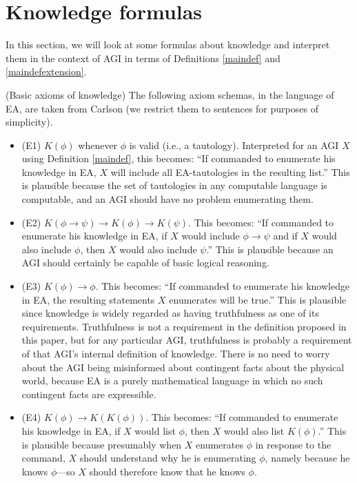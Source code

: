 \documentclass[runningheads]{llncs}
\begin{document}
\section{Knowledge formulas}
\label{appsection}

In this section, we will look at some formulas about knowledge and interpret them in the
context of AGI in terms of Definitions \ref{maindef} and \ref{maindefextension}.

\begin{example}
  (Basic axioms of knowledge) The following axiom schemas, in the language
  of EA, are taken from Carlson \cite{carlson}
  (we restrict them to sentences for purposes of simplicity).
  \begin{itemize}
    \item (E1) $K(\phi)$ whenever $\phi$ is valid (i.e., a tautology).
    Interpreted for an AGI $X$ using Definition \ref{maindef}, this becomes:
    ``If commanded to enumerate his knowledge in EA, $X$ will include
    all EA-tautologies in the resulting list.'' This is plausible
    because the set of tautologies in any computable language is computable,
    and an AGI should have no problem enumerating them.
    \item (E2) $K(\phi\rightarrow\psi)\rightarrow K(\phi)\rightarrow K(\psi)$.
    This becomes: ``If commanded to enumerate his knowledge in EA,
    if $X$ would include $\phi\rightarrow\psi$ and if $X$ would also include
    $\phi$, then $X$ would also include $\psi$.'' This is plausible because
    an AGI should certainly be capable of basic logical reasoning.
    \item (E3) $K(\phi)\rightarrow\phi$. This becomes: ``If commanded to enumerate
    his knowledge in EA, the resulting statements $X$ enumerates
    will be true.'' This is plausible since knowledge is widely regarded as
    having truthfulness as one of its requirements. Truthfulness is not a
    requirement in the definition proposed in this paper, but for any particular
    AGI, truthfulness is probably a requirement of that AGI's internal definition
    of knowledge. There is no need to worry about the AGI being misinformed about
    contingent facts about the physical world, because EA is a purely mathematical
    language in which no such contingent facts are expressible.
    \item (E4) $K(\phi)\rightarrow K(K(\phi))$. This becomes: ``If commanded to
    enumerate his knowledge in EA, if $X$ would list $\phi$,
    then $X$ would also list $K(\phi)$.'' This is plausible because presumably
    when $X$ enumerates $\phi$ in response to the command, $X$ should
    understand why he is enumerating $\phi$, namely because he knows $\phi$---so $X$
    should therefore know that he knows $\phi$.
  \end{itemize}
\end{example}
\end{document}
